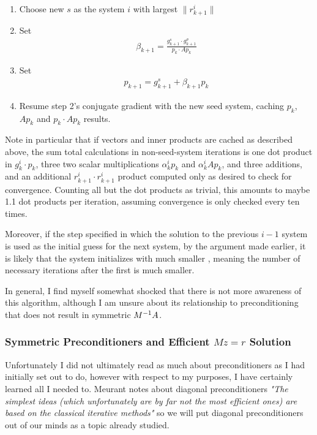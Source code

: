 \documentclass[11pt]{article}
\begin{document}
\begin{itemize}
\begin{enumerate}
\item Choose new $s$ as the system $i$ with largest $\lVert r_{k+1}^i \rVert$
\item Set \begin{gather*}
\beta_{k+1} = \frac{g_{k+1}^s \cdot g_{k+1}^\sigma }{p_k \cdot A p_k}
\end{gather*}
\item Set \begin{gather*}
p_{k+1} = g_{k+1}^s + \beta_{k+1} p_k
\end{gather*}
\item Resume step 2's conjugate gradient with the new seed system, caching $p_k$, $Ap_k$ and $p_k \cdot A p_k$ results.
\end{enumerate}
\end{itemize}

Note in particular that if vectors and inner products are cached as described above, the sum total calculations in non-seed-system iterations is one dot product in $g_k^i \cdot p_k$, three two scalar multiplications $\alpha_k^i p_k$ and $\alpha_k^i A p_k$, and three additions, and an additional $r_{k+1}^i \cdot r_{k+1}^i$ product computed only as desired to check for convergence. Counting all but the dot products as trivial, this amounts to maybe 1.1 dot products per iteration, assuming convergence is only checked every ten times.

Moreover, if the step specified in which the solution to the previous $i-1$ system is used as the initial guess for the next system, by the argument made earlier, it is likely that the system initializes with much smaller , meaning the number of necessary iterations after the first is much smaller.

In general, I find myself somewhat shocked that there is not more awareness of this algorithm, although I am unsure about its relationship to preconditioning that does not result in symmetric $M^{-1} A$. 

\subsubsection{Symmetric Preconditioners and Efficient $Mz = r$ Solution}

Unfortunately I did not ultimately read as much about preconditioners as I had initially set out to do, however with respect to my purposes, I have certainly learned all I needed to. Meurant notes about diagonal preconditioners \emph{"The simplest ideas (which unfortunately are by far not the most efficient ones) are based on the classical iterative methods"} so we will put diagonal preconditioners out of our minds as a topic already studied. 
\end{document}

